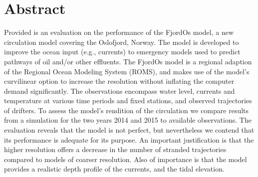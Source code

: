 \documentclass[12pt,a4paper,english]{article}
\begin{document}
\clearpage

\thispagestyle{fancy} %
\headheight=15pt
\renewcommand{\headrulewidth}{0pt}

\section*{\hspace{17mm}Abstract}
Provided is an evaluation on the performance of the FjordOs model, a new circulation model covering the Oslofjord, Norway. The model is developed to improve the ocean input (e.g., currents) to emergency models used to predict pathways of oil and/or other effluents. The FjordOs model is a regional adaption of the Regional Ocean Modeling System (ROMS), and makes use of the model's curvilinear option to increase the resolution without inflating the computer demand significantly. The observations encompass water level, currents and temperature at various time periods and fixed stations, and observed trajectories of drifters. To assess the model's rendition of the circulation we compare results from a simulation for the two years 2014 and 2015 to available observations. The evaluation reveals that the model is not perfect, but nevertheless we contend that its performance is adequate for its purpose. An important justification is that the higher resolution offers a decrease in the number of stranded trajectories compared to models of coarser resolution. Also of importance is that the model provides a realistic depth profile of the currents, and the tidal elevation. 


\vfill
\end{document}
